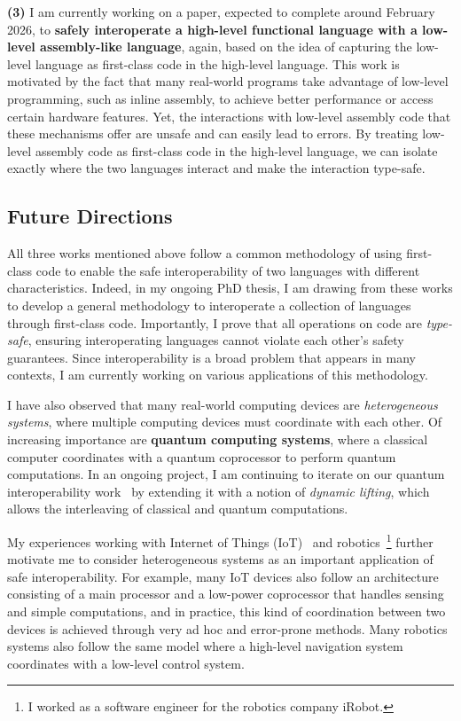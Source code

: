 \documentclass[11pt]{article}
\begin{document}
\textbf{(3)} I am currently working on a paper, expected to complete around February 2026, to \textbf{safely interoperate a high-level functional language with a low-level assembly-like language}, again, based on the idea of capturing the low-level language as first-class code in the high-level language.
This work is motivated by the fact that many real-world programs take advantage of low-level programming, such as inline assembly, to achieve better performance or access certain hardware features.
Yet, the interactions with low-level assembly code that these mechanisms offer are unsafe and can easily lead to errors.
By treating low-level assembly code as first-class code in the high-level language, we can isolate exactly where the two languages interact and make the interaction type-safe.

\subsection*{Future Directions}
All three works mentioned above follow a common methodology of using first-class code to enable the safe interoperability of two languages with different characteristics.
Indeed, in my ongoing PhD thesis, I am drawing from these works to develop a general methodology to interoperate a collection of languages through first-class code.
Importantly, I prove that all operations on code are \emph{type-safe}, ensuring interoperating languages cannot violate each other's safety guarantees.
Since interoperability is a broad problem that appears in many contexts, I am currently working on various applications of this methodology.

I have also observed that many real-world computing devices are \emph{heterogeneous systems}, where multiple computing devices must coordinate with each other.
Of increasing importance are \textbf{quantum computing systems},
where a classical computer coordinates with a quantum coprocessor to perform quantum computations.
In an ongoing project, I am continuing to iterate on our quantum interoperability work~\cite{Kavanagh25arxiv} by extending it with a notion of \emph{dynamic lifting}, which allows the interleaving of classical and quantum computations.

My experiences working with Internet of Things (IoT)~\cite{Sano18wasa} and robotics~\footnote{I worked as a software engineer for the robotics company iRobot.} further motivate me to consider heterogeneous systems as an important application of safe interoperability.
For example, many IoT devices also follow an architecture consisting of a main processor and a low-power coprocessor that handles sensing and simple computations, and in practice, this kind of coordination between two devices is achieved through very ad hoc and error-prone methods.
Many robotics systems also follow the same model where a high-level navigation system coordinates with a low-level control system.
\end{document}
